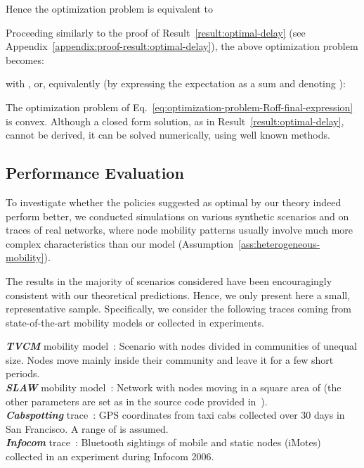 \documentclass[journal]{IEEEtran}
\newcommand{\eq}[1]{Eq.~\eqref{#1}}
\begin{document}
Hence the optimization problem is equivalent to




Proceeding similarly to the proof of Result~\ref{result:optimal-delay} (see Appendix~\ref{appendix:proof-result:optimal-delay}), the above optimization problem becomes:

with , or, equivalently (by expressing the expectation as a sum and denoting ):

The optimization problem of \eq{eq:optimization-problem-Roff-final-expression} is convex. Although a closed form solution, as in Result~\ref{result:optimal-delay}, cannot be derived, it can be solved numerically, using well known methods.







\subsection{Performance Evaluation}\label{sec:offloading-evaluation}
To investigate whether the policies suggested as optimal by our theory indeed perform better, we conducted simulations on various synthetic scenarios and on traces of real networks, where node mobility patterns usually involve much more complex characteristics than our model (Assumption~\ref{ass:heterogeneous-mobility}).


The results in the majority of scenarios considered have been encouragingly consistent with our theoretical predictions. Hence, we only present here a small, representative sample. Specifically, we consider the following traces coming from state-of-the-art mobility models or collected in experiments.

\noindent\textit{\textbf{TVCM}} mobility model~\cite{tvcm}: Scenario with  nodes divided in  communities of unequal size. Nodes move mainly inside their community and leave it for a few short periods.\\
\textit{\textbf{SLAW}} mobility model~\cite{slaw}: Network with  nodes moving in a square area of  (the other parameters are set as in the source code provided in~\cite{slaw}).\\
\textit{\textbf{Cabspotting}} trace~\cite{cabspotting-trace}: GPS coordinates from  taxi cabs collected over 30 days in San Francisco. A range of  is assumed.\\
\textit{\textbf{Infocom}} trace~\cite{Infocom-trace}: Bluetooth sightings of  mobile and static nodes (iMotes) collected in an experiment during Infocom 2006.
\end{document}
